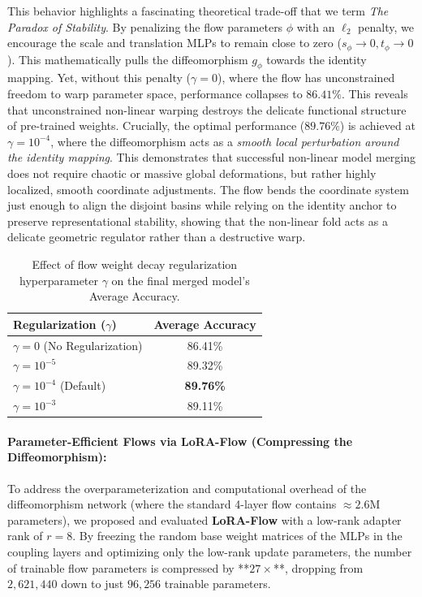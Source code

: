 This behavior highlights a fascinating theoretical trade-off that we term \emph{The Paradox of Stability}. 
By penalizing the flow parameters $\phi$ with an $\ell_2$ penalty, we encourage the scale and translation MLPs to remain close to zero ($s_\phi \to 0, t_\phi \to 0$). 
This mathematically pulls the diffeomorphism $g_\phi$ towards the identity mapping. 
Yet, without this penalty ($\gamma = 0$), where the flow has unconstrained freedom to warp parameter space, performance collapses to $86.41\%$. 
This reveals that unconstrained non-linear warping destroys the delicate functional structure of pre-trained weights. 
Crucially, the optimal performance ($89.76\%$) is achieved at $\gamma = 10^{-4}$, where the diffeomorphism acts as a \emph{smooth local perturbation around the identity mapping}. 
This demonstrates that successful non-linear model merging does not require chaotic or massive global deformations, but rather highly localized, smooth coordinate adjustments. 
The flow bends the coordinate system just enough to align the disjoint basins while relying on the identity anchor to preserve representational stability, showing that the non-linear fold acts as a delicate geometric regulator rather than a destructive warp.

\begin{table}[h]
\caption{Effect of flow weight decay regularization hyperparameter $\gamma$ on the final merged model's Average Accuracy.}
\label{tab:ablation_regularization}
\vskip 0.15in
\begin{center}
\begin{small}
\begin{sc}
\begin{tabular}{lc}
\toprule
Regularization ($\gamma$) & Average Accuracy \\
\midrule
$\gamma = 0$ (No Regularization) & 86.41\% \\
$\gamma = 10^{-5}$ & 89.32\% \\
$\gamma = 10^{-4}$ (Default) & \textbf{89.76\%} \\
$\gamma = 10^{-3}$ & 89.11\% \\
\bottomrule
\end{tabular}
\end{sc}
\end{small}
\end{center}
\vskip -0.1in
\end{table}

\paragraph{Parameter-Efficient Flows via LoRA-Flow (Compressing the Diffeomorphism):}
To address the overparameterization and computational overhead of the diffeomorphism network (where the standard 4-layer flow contains $\approx 2.6\text{M}$ parameters), we proposed and evaluated \textbf{LoRA-Flow} with a low-rank adapter rank of $r=8$. 
By freezing the random base weight matrices of the MLPs in the coupling layers and optimizing only the low-rank update parameters, the number of trainable flow parameters is compressed by **$27\times$**, dropping from $2,621,440$ down to just $96,256$ trainable parameters.

